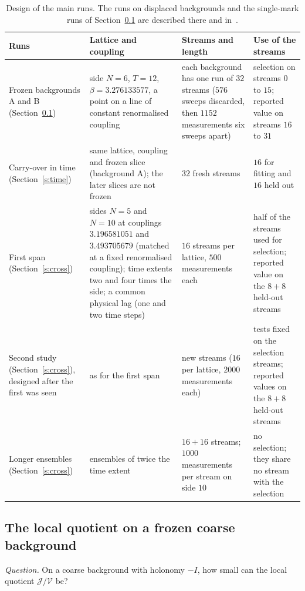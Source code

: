 \begin{table}[t]
\centering\small
\begin{tabular}{@{}>{\raggedright\arraybackslash}p{}>{\raggedright\arraybackslash}p{}>{\raggedright\arraybackslash}p{}>{\raggedright\arraybackslash}p{}@{}}
\toprule
Runs & Lattice and coupling & Streams and length & Use of the streams \\
\midrule
Frozen backgrounds A and B (Section~\ref{s:local}) &
side $N=6$, $T=12$, $\beta=3.276133577$, a point on a line of constant renormalised coupling &
each background has one run of $32$ streams ($576$ sweeps discarded, then $1152$ measurements six sweeps apart) &
selection on streams $0$ to $15$; reported value on streams $16$ to $31$ \\
\addlinespace
Carry-over in time (Section~\ref{s:time}) &
same lattice, coupling and frozen slice (background A); the later slices are not frozen &
$32$ fresh streams &
$16$ for fitting and $16$ held out \\
\addlinespace
First span (Section~\ref{s:cross}) &
sides $N=5$ and $N=10$ at couplings $3.196581051$ and $3.493705679$ (matched at a fixed renormalised
coupling); time extents two and four times the side; a common physical lag (one and two time steps) &
$16$ streams per lattice, $500$ measurements each &
half of the streams used for selection; reported value on the $8+8$ held-out streams \\
\addlinespace
Second study (Section~\ref{s:cross}), designed after the first was seen &
as for the first span &
new streams ($16$ per lattice, $2000$ measurements each) &
tests fixed on the selection streams; reported values on the $8+8$ held-out streams \\
\addlinespace
Longer ensembles (Section~\ref{s:cross}) &
ensembles of twice the time extent &
$16+16$ streams; $1000$ measurements per stream on side $10$ &
no selection; they share no stream with the selection \\
\bottomrule
\end{tabular}
\caption{Design of the main runs. The runs on displaced backgrounds and the single-mark runs of
Section~\ref{s:local} are described there and in~\cite{RepoData}.}\label{tab:runs}
\end{table}

\subsection{The local quotient on a frozen coarse background}\label{s:local}
\emph{Question.} On a coarse background with holonomy $-I$, how small can the local quotient
$\mathcal J/\mathcal V$ be?

